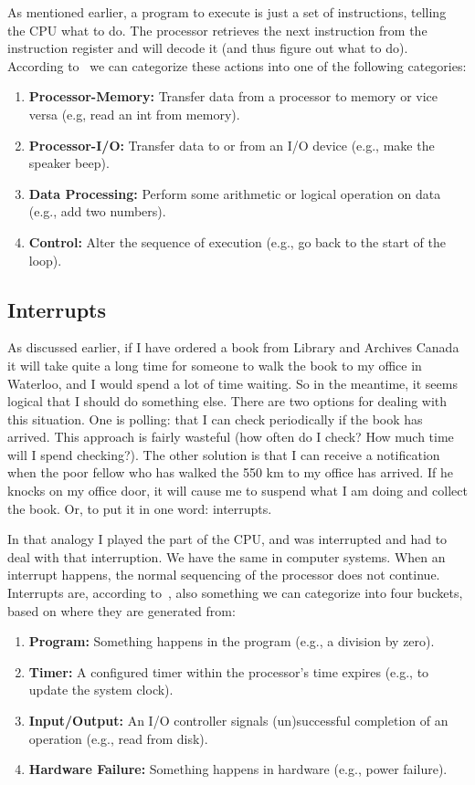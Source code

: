 As mentioned earlier, a program to execute is just a set of instructions, telling the CPU what to do. The processor retrieves the next instruction from the instruction register and will decode it (and thus figure out what to do). According to~\cite{osi} we can categorize these actions into one of the following categories:

\begin{enumerate}
	\item \textbf{Processor-Memory:} Transfer data from a processor to memory or vice versa (e.g, read an int from memory).
	\item \textbf{Processor-I/O:} Transfer data to or from an I/O device (e.g., make the speaker beep).
	\item \textbf{Data Processing:} Perform some arithmetic or logical operation on data (e.g., add two numbers).
	\item \textbf{Control:} Alter the sequence of execution (e.g., go back to the start of the loop).
\end{enumerate}


\subsection*{Interrupts}

As discussed earlier, if I have ordered a book from Library and Archives Canada it will take quite a long time for someone to walk the book to my office in Waterloo, and I would spend a lot of time waiting. So in the meantime, it seems logical that I should do something else. There are two options for dealing with this situation. One is polling: that I can check periodically if the book has arrived. This approach is fairly wasteful (how often do I check? How much time will I spend checking?). The other solution is that I can receive a notification when the poor fellow who has walked the 550 km to my office has arrived. If he knocks on my office door, it will cause me to suspend what I am doing and collect the book. Or, to put it in one word: interrupts.

In that analogy I played the part of the CPU, and was interrupted and had to deal with that interruption. We have the same in computer systems. When an interrupt happens, the normal sequencing of the processor does not continue. Interrupts are, according to~\cite{osi}, also something we can categorize into four buckets, based on where they are generated from:

\begin{enumerate}
	\item \textbf{Program:} Something happens in the program (e.g., a division by zero).
	\item \textbf{Timer:} A configured timer within the processor's time expires (e.g., to update the system clock).
	\item \textbf{Input/Output:} An I/O controller signals (un)successful completion of an operation (e.g., read from disk).
	\item \textbf{Hardware Failure:} Something happens in hardware (e.g., power failure).
\end{enumerate}


